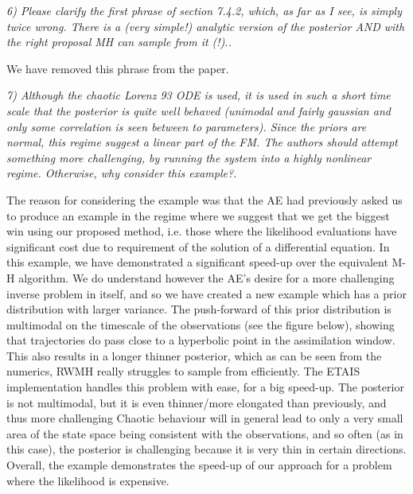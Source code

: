 \documentclass{article}
\newcommand{\comment}[2]{\vspace{0.6cm}{\bf Comment:} {\it #1.}

\vspace{0.3cm}{\bf Answer:} #2}
\begin{document}
\comment{6) Please clarify the first phrase of section 7.4.2, which, as far as I see, is simply twice wrong. There is a (very simple!) analytic version of the posterior AND with the right proposal MH can sample from it (!).}{We have removed this phrase from the paper.}

\comment{7) Although the chaotic Lorenz 93 ODE is used, it is used in such a short time scale that the posterior is quite well behaved (unimodal and fairly gaussian and only some correlation is seen between to parameters). Since the priors are normal, this regime suggest a linear part of the FM. The authors should attempt something more challenging, by running the system into a highly nonlinear regime. Otherwise, why consider this example?}{The reason for considering the example was that the AE had previously asked us to produce an example in the regime where we suggest that we get the biggest win using our proposed method, i.e. those where the likelihood evaluations have significant cost due to requirement of the solution of a differential equation. In this example, we have demonstrated a significant speed-up over the equivalent M-H algorithm. We do understand however the AE's desire for a more challenging inverse problem in itself, and so we have created a new example which has a prior distribution with larger variance. The push-forward of this prior distribution is multimodal on the timescale of the observations (see the figure below), showing that trajectories do pass close to a hyperbolic point in the assimilation window. This also results in a longer thinner posterior, which as can be seen from the numerics, RWMH really struggles to sample from efficiently. The ETAIS implementation handles this problem with ease, for a big speed-up. The posterior is not multimodal, but it is even thinner/more elongated than previously, and thus more challenging Chaotic behaviour will in general lead to only a very small area of the state space being consistent with the observations, and so often (as in this case), the posterior is challenging because it is very thin in certain directions. Overall, the example demonstrates the speed-up of our approach for a problem where the likelihood is expensive.}
\end{document}
